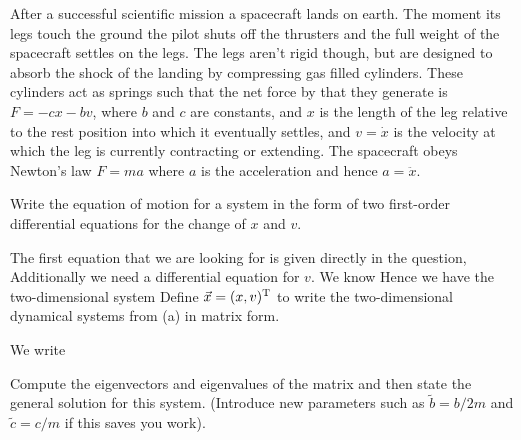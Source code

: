 
After a successful scientific mission a spacecraft lands on earth. The moment its legs touch the ground the pilot shuts off the thrusters
and the full weight of the spacecraft settles on the legs. The legs aren't rigid though, but are designed to absorb the shock of the landing by compressing gas filled cylinders. These cylinders act as springs such that the net force by that they generate is $F=-cx-bv$, where $b$ and $c$ are  constants, and $x$ is the length of the leg relative to the rest position into which it eventually settles, and $v=\dot{x}$ is the velocity at which the leg is currently contracting or extending. The spacecraft obeys Newton's law $F=ma$ where $a$ is the acceleration and hence $a=\ddot{x}$. 

\subquestion
Write the equation of motion for a system in the form of two first-order differential equations for the change of $x$ and $v$. 

\solution 
The first equation that we are looking for is given directly in the question,
Additionally we need a differential equation for $v$. We know
Hence we have the two-dimensional system 
\subquestion 
Define $\vec{x}=(x,v)^{\rm T}$ to write the two-dimensional dynamical systems from (a) in matrix form.

\solution
We write 

\subquestion 
Compute the eigenvectors and eigenvalues of the matrix and then state the general solution for this system. (Introduce new parameters such as $\tilde{b}=b/2m$ and $\tilde{c}=c/m$ if this saves you work).

